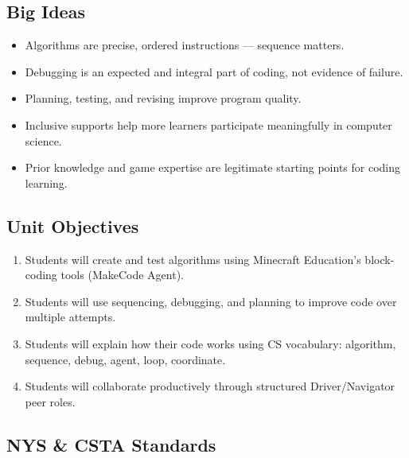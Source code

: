 \documentclass[12pt]{article}
\begin{document}
\subsection{Big Ideas}

\begin{itemize}
\item Algorithms are precise, ordered instructions --- sequence matters.
\item Debugging is an expected and integral part of coding, not evidence of failure.
\item Planning, testing, and revising improve program quality.
\item Inclusive supports help more learners participate meaningfully in computer science.
\item Prior knowledge and game expertise are legitimate starting points for coding learning.
\end{itemize}

\subsection{Unit Objectives}

\begin{enumerate}
\item Students will create and test algorithms using Minecraft Education's block-coding tools (MakeCode Agent).
\item Students will use sequencing, debugging, and planning to improve code over multiple attempts.
\item Students will explain how their code works using CS vocabulary: algorithm, sequence, debug, agent, loop, coordinate.
\item Students will collaborate productively through structured Driver/Navigator peer roles.
\end{enumerate}

\subsection{NYS \& CSTA Standards}
\end{document}
